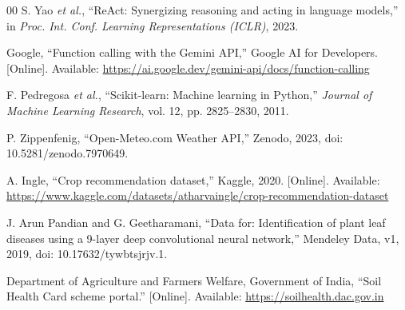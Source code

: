 \documentclass[conference]{IEEEtran}
\begin{document}
\begin{thebibliography}{00}
 S. Yao \emph{et al.}, ``ReAct: Synergizing reasoning and acting in language models,'' in \emph{Proc. Int. Conf. Learning Representations (ICLR)}, 2023.

 Google, ``Function calling with the Gemini API,'' Google AI for Developers. [Online]. Available: \url{https://ai.google.dev/gemini-api/docs/function-calling}

 F. Pedregosa \emph{et al.}, ``Scikit-learn: Machine learning in Python,'' \emph{Journal of Machine Learning Research}, vol. 12, pp. 2825--2830, 2011.

 P. Zippenfenig, ``Open-Meteo.com Weather API,'' Zenodo, 2023, doi: 10.5281/zenodo.7970649.

 A. Ingle, ``Crop recommendation dataset,'' Kaggle, 2020. [Online]. Available: \url{https://www.kaggle.com/datasets/atharvaingle/crop-recommendation-dataset}

 J. Arun Pandian and G. Geetharamani, ``Data for: Identification of plant leaf diseases using a 9-layer deep convolutional neural network,'' Mendeley Data, v1, 2019, doi: 10.17632/tywbtsjrjv.1.

 Department of Agriculture and Farmers Welfare, Government of India, ``Soil Health Card scheme portal.'' [Online]. Available: \url{https://soilhealth.dac.gov.in}

\end{thebibliography}
\end{document}
